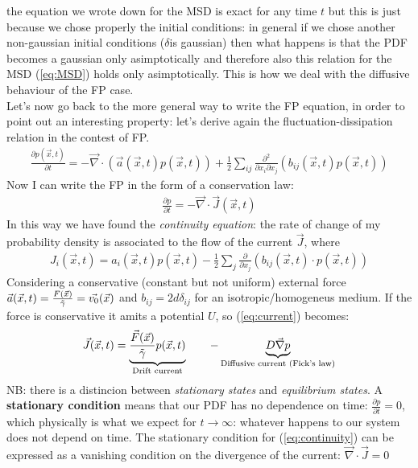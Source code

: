 \documentclass[\main/main.tex]{subfiles}
\begin{document}
the equation we wrote down for the MSD is exact for any time $t$ but this is just because we chose properly the initial conditions: in general if we chose another non-gaussian initial conditions ($\delta$is gaussian) then what happens is that the PDF becomes a gaussian only asimptotically and therefore also this relation for the MSD (\ref{eq:MSD}) holds only asimptotically.
This is how we deal with the diffusive behaviour of the FP case. \\

Let's now go back to the more general way to write the FP equation, in order to point out an interesting property: let's derive again the fluctuation-dissipation relation in the contest of FP.
\begin{eqnarray}
\frac{\partial p(\vec{x},t)}{\partial t}= - \vec{\nabla}\cdot(\vec{a}(\vec{x},t)p(\vec{x},t))+\frac{1}{2}\sum_{ij}\frac{\partial^2}{\partial x_i \partial x_j} (b_{ij}(\vec{x},t)p(\vec{x},t))
\end{eqnarray}
Now I can write the FP in the form of a conservation law:
\begin{eqnarray}
\frac{\partial p}{\partial t}= -\vec{\nabla}\cdot \vec{J}(\vec{x},t)
\label{eq:continuity}
\end{eqnarray}
In this way we have found the \textit{continuity equation}: the rate of change of my probability density is associated to the flow of the current $\vec{J}$, where 
\begin{eqnarray}
{J}_i(\vec{x},t)=a_i(\vec{x},t)p(\vec{x},t)-\frac{1}{2}\sum_j \frac{\partial}{\partial x_j}(b_{ij}(\vec{x},t)\cdot p(\vec{x},t))
\label{eq:current}
\end{eqnarray}
Considering a conservative (constant but not uniform) external force $\vec{a}(\vec{x},t)= \frac{F(\vec{x})}{\Tilde{\gamma}}=\vec{v_0}(\vec{x})$ and $b_{ij}=2d\delta_{ij}$ for an isotropic/homogeneus medium.
If the force is conservative it amits a potential $U$, so
(\ref{eq:current}) becomes:
\begin{eqnarray}
\vec{J}(\vec{x},t)=\underbrace{\frac{\vec{F}(\vec{x})}{\Tilde{\gamma}}p(\vec{x},t)}_{\text{Drift current}}\qquad -\underbrace{D\vec{\nabla}p}_{\text{Diffusive current (Fick's law)}}
\label{eq:J}
\end{eqnarray}
NB: there is a distincion between \textit{stationary states} and \textit{equilibrium states}.
A \textbf{stationary condition} means that our PDF has no dependence on time: $\frac{\partial p}{\partial t}=0$, which physically is what we expect for $t\to \infty$: whatever happens to our system does not depend on time. The stationary condition for (\ref{eq:continuity}) can be expressed as a vanishing condition on the divergence of the current: $\vec{\nabla}\cdot\vec{J}=0$ \\
\end{document}
